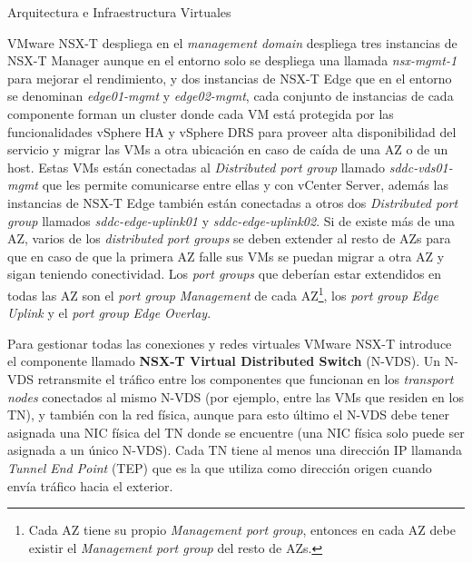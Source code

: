 \begin{subsection}{Arquitectura e Infraestructura Virtuales\cite{CFVirtInfraes}}

VMware NSX-T despliega en el \textit{management domain} despliega tres instancias de NSX-T Manager aunque en el entorno solo se despliega una llamada \textit{nsx-mgmt-1} para mejorar el rendimiento, y dos instancias de NSX-T Edge que en el entorno se denominan \textit{edge01-mgmt} y \textit{edge02-mgmt}, cada conjunto de instancias de cada componente forman un cluster donde cada VM está protegida por las funcionalidades vSphere HA y vSphere DRS para proveer alta disponibilidad del servicio y migrar las VMs a otra ubicación en caso de caída de una AZ o de un host. Estas VMs están conectadas al \textit{Distributed port group} llamado \textit{sddc-vds01-mgmt} que les permite comunicarse entre ellas y con vCenter Server, además las instancias de NSX-T Edge también están conectadas a otros dos \textit{Distributed port group} llamados \textit{sddc-edge-uplink01} y \textit{sddc-edge-uplink02}. Si de existe más de una AZ, varios de los \textit{distributed port groups} se deben extender al resto de AZs para que en caso de que la primera AZ falle sus VMs se puedan migrar a otra AZ y sigan teniendo conectividad. Los \textit{port groups} que deberían estar extendidos en todas las AZ son el \textit{port group} \textit{Management} de cada AZ\footnote{Cada AZ tiene su propio \textit{Management port group}, entonces en cada AZ debe existir el \textit{Management port group} del resto de AZs.}, los \textit{port group} \textit{Edge Uplink} y el \textit{port group} \textit{Edge Overlay}.

Para gestionar todas las conexiones y redes virtuales VMware NSX-T introduce el componente llamado \textbf{NSX-T Virtual Distributed Switch} (N-VDS). Un N-VDS retransmite el tráfico entre los componentes que funcionan en los \textit{transport nodes} conectados al mismo N-VDS (por ejemplo, entre las VMs que residen en los TN), y también con la red física, aunque para esto último el N-VDS debe tener asignada una NIC física del TN donde se encuentre (una NIC física solo puede ser asignada a un único N-VDS). Cada TN tiene al menos una dirección IP llamanda \textit{Tunnel End Point} (TEP) que es la que utiliza como dirección origen cuando envía tráfico hacia el exterior.


\end{subsection}
